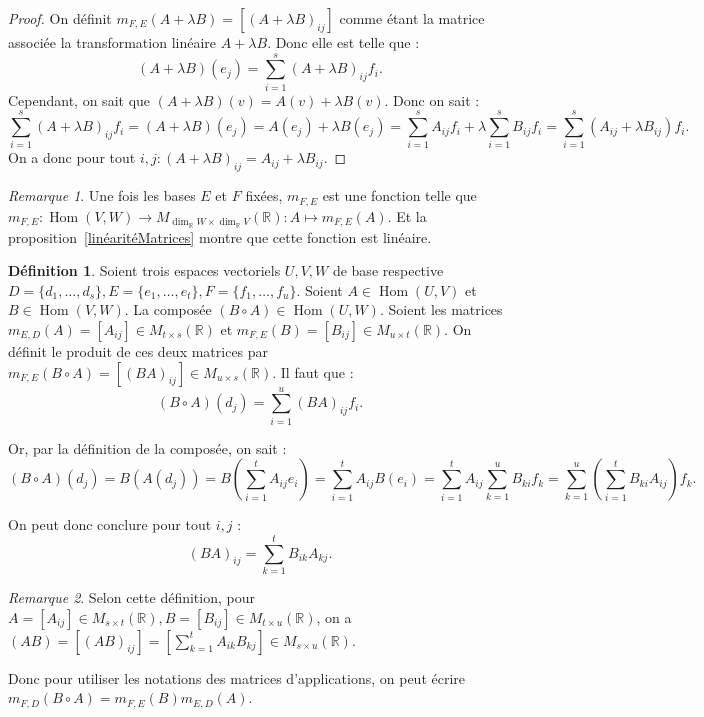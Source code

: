 \documentclass{article}
\DeclareMathOperator{\Hom}{Hom}
\newcommand{\R}{\mathbb R}
\newcommand{\M}[3]{M_{#1 \times #2}(#3)}
\theoremstyle{definition}
\newtheorem{déf}[thm]{Définition}
\theoremstyle{remark}
\newtheorem*{rmq}{Remarque}
\begin{document}
		\begin{proof} On définit $m_{F, E}(A + \lambda B) = [(A+ \lambda B)_{ij}]$ comme étant la matrice associée la transformation linéaire $A+\lambda B$. Donc elle est
		telle que : \[(A+\lambda B)(e_j) = \sum_{i=1}^s(A + \lambda B)_{ij}f_i.\] Cependant, on sait que $(A+\lambda B)(v) = A(v) + \lambda B(v)$. Donc on sait :
		\[\sum_{i=1}^s(A + \lambda B)_{ij}f_i = (A+\lambda B)(e_j) = A(e_j) + \lambda B(e_j) = \sum_{i=1}^sA_{ij}f_i + \lambda\sum_{i=1}^sB_{ij}f_i
		= \sum_{i=1}^s(A_{ij} + \lambda B_{ij})f_i.\] On a donc pour tout $i, j : (A+\lambda B)_{ij} = A_{ij} + \lambda B_{ij}$. \end{proof}

		\begin{rmq} Une fois les bases $E$ et $F$ fixées, $m_{F, E}$ est une fonction telle que $m_{F, E} : \Hom(V, W) \to \M {\dim_\R W}{\dim_\R V}\R : A \mapsto m_{F, E}(A)$.
		Et la proposition~\ref{linéaritéMatrices} montre que cette fonction est linéaire. \end{rmq}

		\begin{déf} Soient trois espaces vectoriels $U, V, W$ de base respective $D = \{d_1, \ldots, d_s\}, E = \{e_1, \ldots, e_t\}, F = \{f_1, \ldots, f_u\}$.
		Soient $A \in \Hom(U, V)$ et $B \in \Hom(V, W)$. La composée $(B \circ A) \in \Hom(U, W)$. Soient les matrices $m_{E, D}(A) = [A_{ij}] \in \M ts\R$ et
		$m_{F, E}(B) = [B_{ij}] \in \M ut\R$. On définit le produit de ces deux matrices par $m_{F, E}(B \circ A) = [(BA)_{ij}] \in \M us\R$. Il faut que :
		\[(B \circ A)(d_j) = \sum_{i=1}^u(BA)_{ij}f_i. \]
		
		Or, par la définition de la composée, on sait : \[(B \circ A)(d_j) = B(A(d_j)) = B\left(\sum_{i=1}^tA_{ij}e_i\right) = \sum_{i=1}^tA_{ij}B(e_i)
		= \sum_{i=1}^tA_{ij}\sum_{k=1}^uB_{ki}f_k = \sum_{k=1}^u\left(\sum_{i=1}^tB_{ki}A_{ij}\right)f_k.\]
		
		On peut donc conclure pour tout $i, j$ : \[(BA)_{ij} = \sum_{k=1}^tB_{ik}A_{kj}.\] \end{déf}

		\begin{rmq} Selon cette définition, pour $A = [A_{ij}] \in \M st\R, B = [B_{ij}] \in \M tu\R$, on a
		$(AB) = [(AB)_{ij}] = \left[\sum_{k=1}^tA_{ik}B_{kj}\right] \in \M su\R$.
		
		Donc pour utiliser les notations des matrices d'applications, on peut écrire $m_{F, D}(B \circ A) = m_{F, E}(B)m_{E, D}(A)$. \end{rmq}
\end{document}
